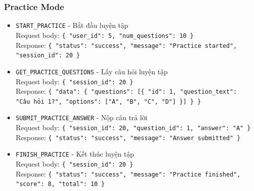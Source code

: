 \documentclass[12pt,a4paper]{report}
\newcommand{\json}[1]{\texttt{\allowbreak#1\allowbreak}}
\begin{document}
\subsubsection{Practice Mode}
\begin{itemize}
    \item \texttt{START\_PRACTICE} - Bắt đầu luyện tập \\
    Request body: \json{\{ "user\_id": 5, "num\_questions": 10 \}} \\
    Response: \json{\{ "status": "success", "message": "Practice started", "session\_id": 20 \}}
    \item \texttt{GET\_PRACTICE\_QUESTIONS} - Lấy câu hỏi luyện tập \\
    Request body: \json{\{ "session\_id": 20 \}} \\
    Response: \json{\{ "data": \{ "questions": [\{ "id": 1, "question\_text": "Câu hỏi 1?", "options": ["A", "B", "C", "D"] \}] \} \}}
    \item \texttt{SUBMIT\_PRACTICE\_ANSWER} - Nộp câu trả lời \\
    Request body: \json{\{ "session\_id": 20, "question\_id": 1, "answer": "A" \}} \\
    Response: \json{\{ "status": "success", "message": "Answer submitted" \}}
    \item \texttt{FINISH\_PRACTICE} - Kết thúc luyện tập \\
    Request body: \json{\{ "session\_id": 20 \}} \\
    Response: \json{\{ "status": "success", "message": "Practice finished", "score": 8, "total": 10 \}}
\end{itemize}
\end{document}
